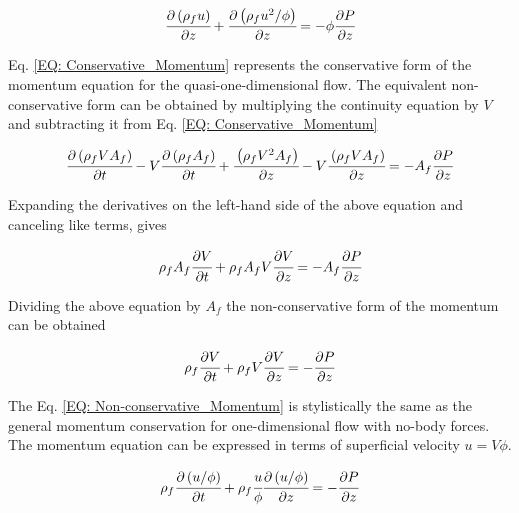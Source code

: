\documentclass[../Article_Model_Parameters.tex]{subfiles}
\begin{document}
	{\footnotesize
		\begin{equation}
			\cfrac{\partial \left( \rho_f u \right)}{\partial z} + \cfrac{\partial \left( \rho_f u^2/\phi \right) }{\partial z} = -\phi \cfrac{\partial 	P}{\partial z}
		\end{equation}
	}

	Eq. \ref{EQ: Conservative_Momentum} represents the conservative form of the momentum equation for the quasi-one-dimensional flow. The equivalent non-conservative form can be obtained by multiplying the continuity equation by $V$ and subtracting it from Eq. \ref{EQ: Conservative_Momentum}
	
	{\footnotesize
		\begin{equation}
			\cfrac{\partial \left( \rho_f V A_f \right)}{\partial t} - V\cfrac{ \partial \left( \rho_f A_f \right) }{\partial t} + \cfrac{\left( \rho_f V^2 A_f 	\right)}{\partial z} - V \cfrac{\left( \rho_f V A_f \right)}{\partial z} = -A_f \cfrac{\partial P}{\partial z}
		\end{equation}
	}
	
	Expanding the derivatives on the left-hand side of the above equation and canceling like terms, gives

	{\footnotesize
		\begin{equation}
			\rho_f A_f \cfrac{\partial V}{\partial t} + \rho_f A_f V \cfrac{\partial V}{\partial z} = -A_f \cfrac{\partial P}{\partial z}
		\end{equation}
	}

	Dividing the above equation by $A_f$ the non-conservative form of the momentum can be obtained
	
	{\footnotesize
		\begin{equation}
			\rho_f \cfrac{\partial V}{\partial t} + \rho_f V \cfrac{\partial V}{\partial z} = -\cfrac{\partial P}{\partial z}
			\label{EQ: Non-conservative_Momentum}
		\end{equation}
	}

	The Eq. \ref{EQ: Non-conservative_Momentum} is stylistically the same as the general momentum conservation for one-dimensional flow with no-body forces. The momentum equation can be expressed in terms of superficial velocity $u=V\phi$. 
	
	{\footnotesize
		\begin{equation}
			\rho_f \cfrac{\partial \left(u / \phi \right)}{\partial t} + \rho_f \cfrac{u}{\phi} \cfrac{\partial \left( u / \phi \right)}{\partial z} = - \cfrac{\partial P}{\partial z}
		\end{equation}
	}
\end{document}
